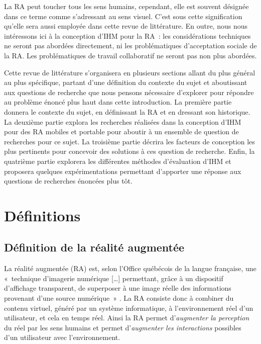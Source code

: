 

La RA peut toucher tous les sens humains, cependant, elle est souvent désignée dans ce terme comme s'adressant au sens visuel. C'est sous cette signification qu'elle sera aussi employée dans cette revue de littérature. En outre, nous nous intéressons ici à la conception d'IHM pour la RA~: les considérations techniques ne seront pas abordées directement, ni les problématiques d'acceptation sociale de la RA. Les problématiques de travail collaboratif ne seront pas non plus abordées.

Cette revue de littérature s'organisera en plusieurs sections allant du plus général au plus spécifique, partant d'une définition du contexte du sujet et aboutissant aux questions de recherche que nous pensons nécessaire d'explorer pour répondre au problème énoncé plus haut dans cette introduction. La première partie donnera le contexte du sujet, en définissant la RA et en dressant son historique. La deuxième partie explora les recherches réalisées dans la conception d'IHM pour des RA mobiles et portable pour aboutir à un ensemble de question de recherches pour ce sujet. La troisième partie décrira les facteurs de conception les plus pertinents pour concevoir des solutions à ces question de recherche. Enfin, la quatrième partie explorera les différentes méthodes d'évaluation d'IHM et proposera quelques expérimentations permettant d'apporter une réponse aux questions de recherches énoncées plus tôt.



\section*{Définitions}
\subsection*{Définition de la réalité augmentée}
La réalité augmentée (RA) est, selon l'Office québécois de la langue française, une «~technique d'imagerie numérique […] permettant, grâce à un dispositif d'affichage transparent, de superposer à une image réelle des informations provenant d'une source numérique~» \citep{OfficeQuebecoisLangueFrancaiseRA2015}. La RA consiste donc à combiner du contenu virtuel, généré par un système informatique, à l'environnement réel d'un utilisateur, et cela en temps réel. Ainsi la RA permet d'\emph{augmenter la perception} du réel par les sens humains et permet d'\emph{augmenter les interactions} possibles d'un utilisateur avec l'environnement. \citep{Azuma1997}


